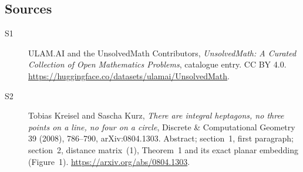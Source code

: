 \documentclass[11pt]{book}
\begin{document}
\subsection{Sources}
\begin{description}
\item[\hypertarget{source:statement:1}{S1}] ULAM.AI and the UnsolvedMath Contributors, \emph{UnsolvedMath: A Curated Collection of Open Mathematics Problems}, catalogue entry. CC BY 4.0. \url{https://huggingface.co/datasets/ulamai/UnsolvedMath}.
\item[\hypertarget{source:statement:2}{S2}] Tobias Kreisel and Sascha Kurz, \emph{There are integral heptagons, no three points on a line, no four on a circle}, Discrete \& Computational Geometry 39 (2008), 786--790, arXiv:0804.1303. Abstract; section~1, first paragraph; section~2, distance matrix~(1), Theorem~1 and its exact planar embedding (Figure~1). \url{https://arxiv.org/abs/0804.1303}.
\end{description}
\label{end:statement}
\end{document}

